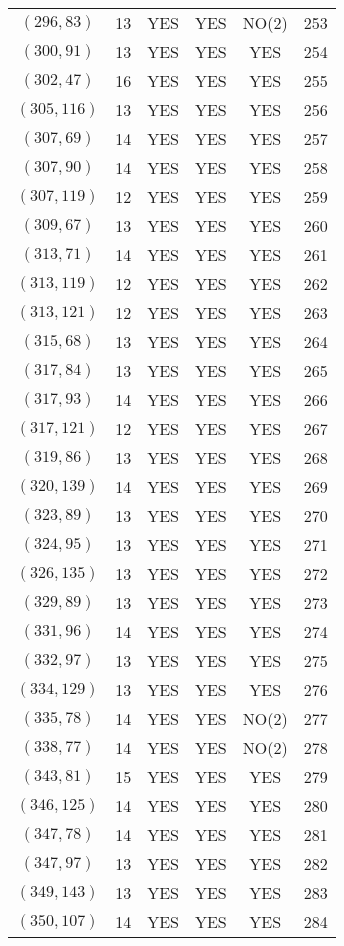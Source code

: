 \begin{longtable}{|c|c|c|c|c|c|}
$(296, 83)$ & 13 & YES & YES & NO(2) & 253\\
$(300, 91)$ & 13 & YES & YES & YES & 254\\
$(302, 47)$ & 16 & YES & YES & YES & 255\\
$(305, 116)$ & 13 & YES & YES & YES & 256\\
$(307, 69)$ & 14 & YES & YES & YES & 257\\
$(307, 90)$ & 14 & YES & YES & YES & 258\\
$(307, 119)$ & 12 & YES & YES & YES & 259\\
$(309, 67)$ & 13 & YES & YES & YES & 260\\
$(313, 71)$ & 14 & YES & YES & YES & 261\\
$(313, 119)$ & 12 & YES & YES & YES & 262\\
$(313, 121)$ & 12 & YES & YES & YES & 263\\
$(315, 68)$ & 13 & YES & YES & YES & 264\\
$(317, 84)$ & 13 & YES & YES & YES & 265\\
$(317, 93)$ & 14 & YES & YES & YES & 266\\
$(317, 121)$ & 12 & YES & YES & YES & 267\\
$(319, 86)$ & 13 & YES & YES & YES & 268\\
$(320, 139)$ & 14 & YES & YES & YES & 269\\
$(323, 89)$ & 13 & YES & YES & YES & 270\\
$(324, 95)$ & 13 & YES & YES & YES & 271\\
$(326, 135)$ & 13 & YES & YES & YES & 272\\
$(329, 89)$ & 13 & YES & YES & YES & 273\\
$(331, 96)$ & 14 & YES & YES & YES & 274\\
$(332, 97)$ & 13 & YES & YES & YES & 275\\
$(334, 129)$ & 13 & YES & YES & YES & 276\\
$(335, 78)$ & 14 & YES & YES & NO(2) & 277\\
$(338, 77)$ & 14 & YES & YES & NO(2) & 278\\
$(343, 81)$ & 15 & YES & YES & YES & 279\\
$(346, 125)$ & 14 & YES & YES & YES & 280\\
$(347, 78)$ & 14 & YES & YES & YES & 281\\
$(347, 97)$ & 13 & YES & YES & YES & 282\\
$(349, 143)$ & 13 & YES & YES & YES & 283\\
$(350, 107)$ & 14 & YES & YES & YES & 284\\

\end{longtable}
